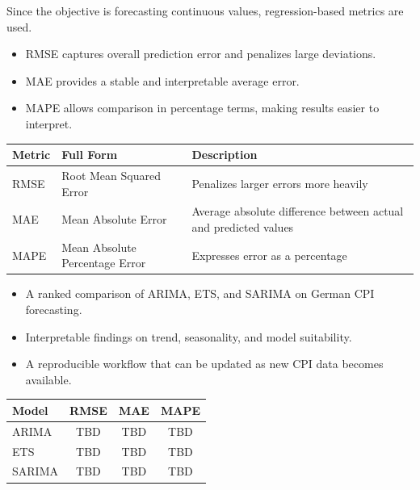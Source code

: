 {
    Since the objective is forecasting continuous values, regression-based metrics are used.
    \vspace{0.25cm}
    \begin{itemize}
        \item RMSE captures overall prediction error and penalizes large deviations.
        \item MAE provides a stable and interpretable average error.
        \item MAPE allows comparison in percentage terms, making results easier to interpret.
    \end{itemize}

    \begin{center}
        \footnotesize
        \begin{tabular}{|p{1.0cm}|p{3.5cm}|p{4.5cm}|}
            \hline
            \textbf{Metric} & \textbf{Full Form} & \textbf{Description} \\
            \hline
            RMSE & Root Mean Squared Error & Penalizes larger errors more heavily \\
            \hline
            MAE & Mean Absolute Error & Average absolute difference between actual and predicted values \\
            \hline
            MAPE & Mean Absolute Percentage Error & Expresses error as a percentage \\
            \hline
        \end{tabular}
    \end{center}


}


{
    \begin{itemize}
        \item A ranked comparison of ARIMA, ETS, and SARIMA on German CPI forecasting.
        \item Interpretable findings on trend, seasonality, and model suitability.
        \item A reproducible workflow that can be updated as new CPI data becomes available.
    \end{itemize}

    \vspace{0.2cm}
    \begin{center}
        \footnotesize
        \begin{tabular}{|l|c|c|c|}
            \hline
            \textbf{Model} & \textbf{RMSE} & \textbf{MAE} & \textbf{MAPE} \\
            \hline
            ARIMA & TBD & TBD & TBD \\
            \hline
            ETS & TBD & TBD & TBD \\
            \hline
            SARIMA & TBD & TBD & TBD \\
            \hline
        \end{tabular}
    \end{center}
}

